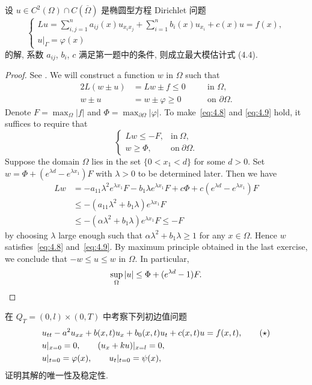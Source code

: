 \begin{exercise}
  设 $u\in C^2(\Omega)\cap C(\overline{\Omega})$ 是椭圆型方程 Dirichlet 问题
  \[\begin{cases}
    Lu = \sum_{i,j=1}^n a_{ij}(x) u_{x_ix_j} + \sum_{i=1}^n b_i(x) u_{x_i} + c(x)u = f(x), \\
    u|_{\varGamma} = \varphi(x)
  \end{cases}\]
  的解, 系数 $a_{ij}$, $b_i$, $c$ 满足第一题中的条件, 则成立最大模估计式 (4.4).
\end{exercise}

\begin{proof}
  See \cite[Proposition 2.15]{han_elliptic_2011}.
  We will construct a function $w$ in $\Omega$ such that
  \begin{alignat}{2}
    L(w\pm u) & = Lw \pm f \leq 0 &\quad& \text{in } \Omega, \label{eq:4.8} \\
    w\pm u    & = w \pm \varphi \geq 0 && \text{on } \partial\Omega. \label{eq:4.9}
  \end{alignat}
  Denote $F = \max_\Omega |f|$ and $\Phi = \max_{\partial\Omega} |\varphi|$.
  To make~\eqref{eq:4.8} and \eqref{eq:4.9} hold, it suffices to require that
  \[\begin{cases}
    Lw \leq -F, & \text{in}\ \Omega, \\
    w\geq \Phi, & \text{on}\ \partial\Omega.
  \end{cases}\]
  Suppose the domain $\Omega$ lies in the set $\{0<x_1<d\}$ for some $d>0$.
  Set $w = \Phi + (e^{\lambda d} - e^{\lambda x_1})F$ with $\lambda>0$
  to be determined later. Then we have
  \begin{align*}
    Lw
    & = -a_{11}\lambda^2 e^{\lambda x_1} F - b_1 \lambda e^{\lambda x_1} F
        + c\Phi + c(e^{\lambda d} - e^{\lambda x_1}) F \\
    & \leq -(a_{11}\lambda^2 + b_1 \lambda) e^{\lambda x_1} F \\
    & \leq -(\alpha\lambda^2 + b_1 \lambda) e^{\lambda x_1} F \leq -F
  \end{align*}
  by choosing $\lambda$ large enough such that $\alpha\lambda^2 + b_1\lambda\geq 1$
  for any $x\in\Omega$. Hence $w$ satisfies~\eqref{eq:4.8}
  and~\eqref{eq:4.9}. By maximum principle obtained in the last exercise,
  we conclude that $-w\leq u\leq w$ in $\Omega$. In particular,
  \[ \sup_\Omega |u| \leq \Phi + (e^{\lambda d}-1)F. \qedhere\]
\end{proof}


\begin{exercise}[3]
  在 $Q_T = (0,l)\times (0,T)$ 中考察下列初边值问题
  \begin{align}
    & u_{tt} - a^2 u_{xx} + b(x,t)u_x + b_0(x,t)u_t + c(x,t)u = f(x,t), \tag{$\star$} \\
    & u|_{x=0} = 0,\qquad (u_x + ku)|_{x=l} = 0, \notag \\
    & u|_{t=0} = \varphi(x), \qquad u_t|_{t=0} = \psi(x), \notag
  \end{align}
  证明其解的唯一性及稳定性.
\end{exercise}

